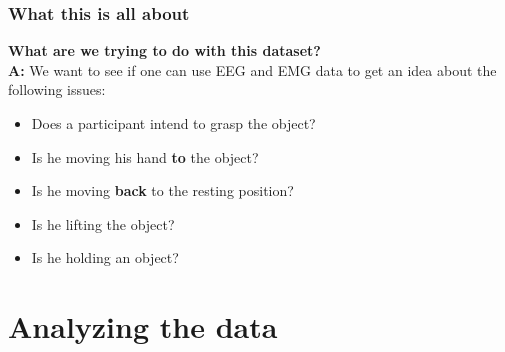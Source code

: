 \documentclass{beamer}
\begin{document}
%



\begin{frame}
	\frametitle{What this is all about}
	\textbf{What are we trying to do with this dataset?}\\
	\textbf{A:} We want to see if one can use EEG and EMG data to get an idea about the following issues: 
	
	\begin{itemize}
		\item Does a participant intend to grasp the object?
		\item Is he moving his hand \textbf{to} the object?
		\item Is he moving \textbf{back} to the resting position?
		\item Is he lifting the object?
		\item Is he holding an object?
	\end{itemize}
	
\end{frame}



\section{Analyzing the data}
\end{document}
